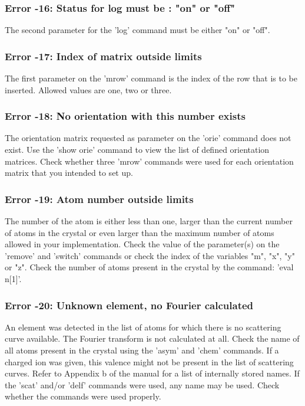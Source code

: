 \subsubsection{Error -16: Status for log must be : "on" or "off"}
\par
The second parameter for the 'log' command must be either "on" or 
"off". 
\subsubsection{Error -17: Index of matrix outside limits}
\par
The first parameter on the 'mrow' command is the index of the row 
that is to be inserted. Allowed values are one, two or three. 
\subsubsection{Error -18: No orientation with this number exists}
\par
The orientation matrix requested as parameter on the 'orie' command 
does not exist. Use the 'show orie' command to view the list of 
defined orientation matrices. Check whether three 'mrow' commands 
were used for each orientation matrix that you intended to set up. 
\subsubsection{Error -19: Atom number outside limits}
\par
The number of the atom is either less than one, larger than the current 
number of atoms in the crystal or even larger than the maximum 
number of atoms allowed in your implementation. 
Check the value of the parameter(s) on the 'remove' and 'switch' 
commands or check the index of the variables "m", "x", "y" or "z". 
Check the number of atoms present in the crystal by the command: 
'eval n[1]'. 
\subsubsection{Error -20: Unknown element, no Fourier calculated}
\par
An element was detected in the list of atoms for which there is no 
scattering curve available. The Fourier transform is not calculated 
at all. Check the name of all atoms present in the crystal using 
the 'asym' and 'chem' commands. If a charged ion was given, this 
valence might not be present in the list of scattering curves. 
Refer to Appendix b of the manual for a list of internally stored 
names. 
If the 'scat' and/or 'delf' commands were used, any name may be used. 
Check whether the commands were used properly. 
